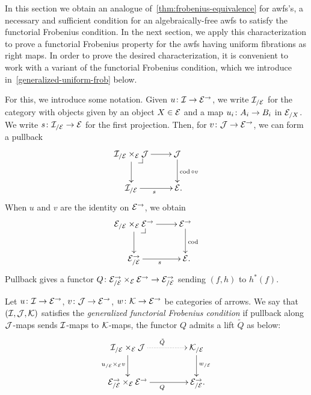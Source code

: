 \documentclass[reqno,10pt,a4paper,oneside,draft]{amsart}
\begin{document}
{{In this section we obtain an analogue of~\cref{thm:frobenius-equivalence} for awfs's, \ie a necessary and sufficient condition for an algebraically-free awfs to satisfy the functorial Frobenius condition.
In the next section, we apply this characterization to prove a functorial Frobenius property for the awfs having uniform fibrations as right maps.
In order to prove the desired characterization, it is convenient to work with a variant of the functorial Frobenius condition, which we introduce in~\cref{generalized-uniform-frob} below.

For this, we introduce some notation.
Given $u \co \cal{I} \to \cal{E}^\to$, we write $\cal{I}_{/\cal{E}}$ for the category with objects given by an object $X \in \cal{E}$ and a map $u_i \co A_i \to B_i$ in $\cal{E}_{/X}$.
We write $s \co \cal{I}_{/\cal{E}} \to \cal{E}$ for the first projection.
Then, for $v \co \cal{J} \to \cal{E}^\to$, we can form a pullback
\[
\xymatrix{
  \cal{I}_{/\cal{E}} \times_{\cal{E}} \cal{J}
  \ar[r]
  \ar[d]
  \pullback{dr}
&
  \cal{J}
  \ar[d]^{\cod \cc v}
\\
  \cal{I}_{/\cal{E}}
  \ar[r]_s
&
  \cal{E}
\rlap{.}}
\]
When $u$ and $v$ are the identity on $\cal{E}^\to$, we obtain
\[
\xymatrix{
  \cal{E}_{/\cal{E}} \times_{\cal{E}} \cal{E}^\to
  \ar[r]
  \ar[d]
  \pullback{dr}
&
  \cal{E}^\to
  \ar[d]^{\cod}
\\
  \cal{E}^\to_{/\cal{E}}
  \ar[r]_s
&
  \cal{E}
\rlap{.}}
\]
Pullback gives a functor $Q \co  \cal{E}^\to_{/\cal{E}} \times_{\cal{E}} \cal{E}^\to \to \cal{E}_{/\cal{E}}^\to$ sending $(f, h)$ to $h^*(f)$.

\begin{definition} \label{generalized-uniform-frob}
Let $u \co \cal{I} \to \cal{E}^\to$, $v \co \cal{J} \to \cal{E}^\to$, $w \co \cal{K} \to \catE^\to$ be categories of arrows.
We say that $(\cal{I}, \cal{J}, \cal{K})$ satisfies the \emph{generalized functorial Frobenius condition} if pullback along $\cal{J}$-maps sends $\cal{I}$-maps to $\cal{K}$-maps, \ie the functor $Q$ admits a lift $\tilde{Q}$ as below:
\begin{equation} \label{generalized-uniform-frob:lift}
\begin{gathered}
\xymatrix@C+2em{
  \cal{I}_{/\cal{E}} \times_{\cal{E}} \cal{J}
  \ar@{.>}[r]^{\tilde{Q}}
  \ar[d]_{u_{/\cal{E}} \times_{\cal{E}} v}
&
  \cal{K}_{/\cal{E}}
  \ar[d]^{w_{/\cal{E}}}
\\
  \cal{E}^\to_{/\cal{E}} \times_{\cal{E}} \cal{E}^\to
  \ar[r]_{Q}
&
  \cal{E}_{/\cal{E}}^\to
\rlap{.}}
\end{gathered}
\end{equation}
\end{definition}

}}
\end{document}
